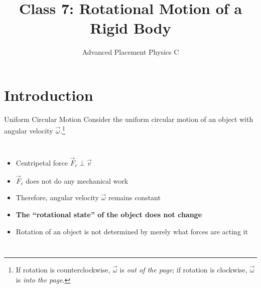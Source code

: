 \documentclass[12pt,compress,aspectratio=169]{beamer}
\title{Class 7: Rotational Motion of a Rigid Body}
\subtitle{Advanced Placement Physics C}
\begin{document}
\begin{frame}
  \maketitle
\end{frame}


\section{Introduction}

\begin{frame}{Uniform Circular Motion}
  Consider the uniform circular motion of an object with angular velocity
  $\vec\omega$.\footnote{If rotation is counterclockwise, $\vec\omega$ is
  \emph{out of the page}; if rotation is clockwise, $\vec\omega$ is
  \emph{into the page}.}
  \begin{columns}
    \centering

    \begin{itemize}
    \item Centripetal force $\vec F_c\perp\vec v$
    \item $\vec F_c$ does not do any mechanical work
    \item Therefore, angular velocity $\vec\omega$ remains constant
    \item\textbf{The ``rotational state'' of the object does not change}
    \item Rotation of an object is not determined by merely what forces are
      acting it
    \end{itemize}
  \end{columns}
  \vspace{.3in}
\end{frame}
\end{document}
